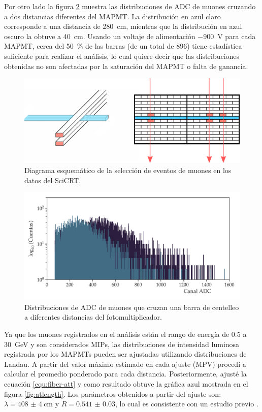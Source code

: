 Por otro lado la figura \ref{fig:adc-distance} muestra las distribuciones de ADC de muones cruzando a dos distancias diferentes del MAPMT. La distribución en azul claro corresponde a una distancia de \SI{280}{\cm}, mientras que la distribución en azul oscuro la obtuve a \SI{40}{\cm}. Usando un voltaje de alimentación \SI{-900}{\volt} para cada MAPMT, cerca del \SI{50}{\percent} de las barras (de un total de \num{896}) tiene estadística suficiente para realizar el análisis, lo cual quiere decir que las distribuciones obtenidas no son afectadas por la saturación del MAPMT o falta de ganancia.

\begin{figure}
        \centering
        \includegraphics[width=\textwidth]{muon-attenuation.pdf}
        \caption{Diagrama esquemático de la selección de eventos de muones en los datos del SciCRT.}
        \label{fig:muon-selection}
\end{figure}

\begin{figure}
        \centering
        \includegraphics[width=\textwidth]{adc_attenuation.pdf}
        \caption{Distribuciones de ADC de muones que cruzan una barra de centelleo a diferentes distancias del fotomultiplicador.}
        \label{fig:adc-distance}
\end{figure}

Ya que los muones registrados en el análisis están el rango de energía de \num{0.5} a \SI{30}{\giga\electronvolt} y son considerados MIPs, las distribuciones de intensidad luminosa registrada por los MAPMTs pueden ser ajustadas utilizando distribuciones de Landau. A partir del valor máximo estimado en cada ajuste (MPV) procedí a calcular el promedio ponderado para cada distancia. Posteriormente, ajusté la ecuación \ref{equ:fiber-att} y como resultado obtuve la gráfica azul mostrada en el figura \ref{fig:atlength}. Los parámetros obtenidos a partir del ajuste son: $\lambda=\SI{408(4)}{\cm}$ y $R=\num{0.541(30)}$, lo cual es consistente con un estudio previo \cite{itow13}.

